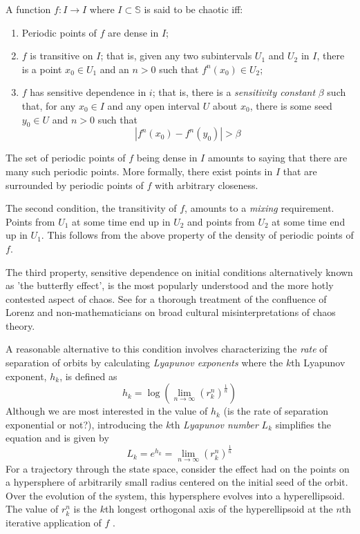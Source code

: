 \documentclass[12pt]{article}
\begin{document}
A function $f : I \rightarrow I$ where $I \subset \mathbb{S}$ is said to be
chaotic \cite{hirsch} iff:
\begin{enumerate}
\item Periodic points of $f$ are dense in $I$;
\item $f$ is transitive on $I$;  that is, given any two subintervals $U_{1}$
and $U_{2}$ in $I$, there is a point $x_{0} \in U_{1}$ and an $n > 0$ such
that $f^{n}(x_{0}) \in U_{2}$;
\item $f$ has sensitive dependence in $i$; that is, there is a
\textit{sensitivity constant} $\beta$ such that, for any $x_{0} \in I$ and
any open interval $U$ about $x_{0}$, there is some seed $y_{0} \in U$ and
$n > 0$ such that
$$|f^{n}(x_{0}) - f^{n}(y_{0})| > \beta$$
\end{enumerate}

The set of periodic points of $f$ being dense in $I$ amounts to saying that
there are many such periodic points.  More formally, there exist points in $I$
that are surrounded by periodic points of $f$ with arbitrary closeness.

The second condition, the transitivity of $f$, amounts to a \textit{mixing}
requirement.  Points from $U_{1}$ at some time end up in $U_{2}$ and points
from $U_{2}$ at some time end up in $U_{1}$.  This follows from the above
property of the density of periodic points of $f$.

The third property, sensitive dependence on initial conditions alternatively
known as 'the butterfly effect', is the most popularly understood and the
more hotly contested aspect of chaos.  See \cite{history} for a thorough
treatment of the
confluence of Lorenz and non-mathematicians on broad cultural
misinterpretations of chaos theory.

A reasonable alternative to this condition involves characterizing
the \textit{rate} of separation of orbits by calculating
\textit{Lyapunov exponents} where the $k$th Lyapunov exponent, $h_{k}$, is defined as
$$h_{k} = \log \left( \lim \limits_{n \to \infty} (r_{k}^{n})^{\frac{1}{n}}\right)$$
Although we are most interested in the value of $h_{k}$
(is the rate of separation exponential or not?), introducing
the $k$th \textit{Lyapunov number} $L_{k}$ simplifies the equation
and is given by
$$L_{k} = e^{h_{k}} = \lim \limits_{n \to \infty} (r_{k}^{n})^{\frac{1}{n}}$$
For a trajectory through the state space, consider the effect had on the
points on a hypersphere of arbitrarily small radius centered on the
initial seed of the orbit.  Over the evolution of the system, this
hypersphere evolves into a hyperellipsoid.
The value of $r_{k}^{n}$ is the $k$th longest orthogonal axis of the
hyperellipsoid at the $n$th iterative application of
$f$ \cite{alligood, nikilov, verstraeten}.
\end{document}
